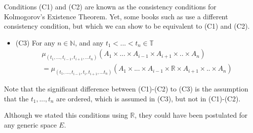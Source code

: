 Conditions (C1) and (C2) are known as the consistency conditions for Kolmogorov's Existence Theorem.
Yet, some books such as \citet{baldi2017introduction} use a different consistency condition, but
which we can show to be equivalent to (C1) and (C2).

\begin{itemize}
	\item (C3) For any $n \in \mathbb N$, and any $t_1<...<t_n \in \mathbb T$
	      \begin{align}
		      \nonumber & \mu_{(t_1,...,t_{i-1},t_{i+1},...t_n)}(A_1 \times ... \times A_{i-1} \times A_{i+1} \times .. \times A_n)
		      \\
		                & = \mu_{(t_1,...,t_{i-1}, t_i,t_{i+1},...t_n)}(A_1 \times ... \times A_{i-1} \times \mathbb R \times A_{i+1} \times .. \times A_n)
		      \label{eq:consistency3}
	      \end{align}
\end{itemize}
Note that the significant difference between (C1)-(C2) to (C3) is the assumption
that the $t_1,...,t_n$ are ordered, which is assumed in (C3), but not in (C1)-(C2).

Although we stated this conditions using $\mathbb R$, they could have been postulated for any
generic space $E$.

